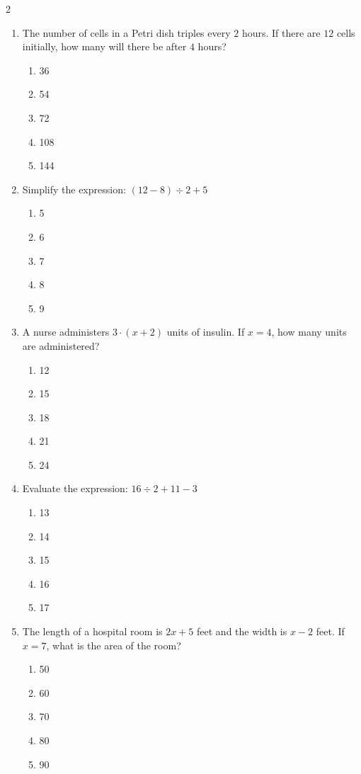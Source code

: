 \documentclass[10pt]{article}
\begin{document}
\begin{multicols}{2}
\begin{enumerate}[label=\textbf{Q\arabic*.}, leftmargin=*, itemsep=6pt, parsep=0pt]
  \item \small The number of cells in a Petri dish triples every $2$ hours. If there are $12$ cells initially, how many will there be after $4$ hours?
  \begin{enumerate}[label=(\Alph*), leftmargin=0.6cm, nosep, itemsep=2pt]
    \item 36
    \item 54
    \item 72
    \item 108
    \item 144
  \end{enumerate}

  \item \small Simplify the expression: $(12 - 8) \div 2 + 5$
  \begin{enumerate}[label=(\Alph*), leftmargin=0.6cm, nosep, itemsep=2pt]
    \item 5
    \item 6
    \item 7
    \item 8
    \item 9
  \end{enumerate}

  \item \small A nurse administers $3 \cdot (x + 2)$ units of insulin. If $x = 4$, how many units are administered?
  \begin{enumerate}[label=(\Alph*), leftmargin=0.6cm, nosep, itemsep=2pt]
    \item 12
    \item 15
    \item 18
    \item 21
    \item 24
  \end{enumerate}

  \item \small Evaluate the expression: $16 \div 2 + 11 - 3$
  \begin{enumerate}[label=(\Alph*), leftmargin=0.6cm, nosep, itemsep=2pt]
    \item 13
    \item 14
    \item 15
    \item 16
    \item 17
  \end{enumerate}

  \item \small The length of a hospital room is $2x + 5$ feet and the width is $x - 2$ feet. If $x = 7$, what is the area of the room?
  \begin{enumerate}[label=(\Alph*), leftmargin=0.6cm, nosep, itemsep=2pt]
    \item 50
    \item 60
    \item 70
    \item 80
    \item 90
  \end{enumerate}

\end{enumerate}
\end{multicols}
\end{document}
